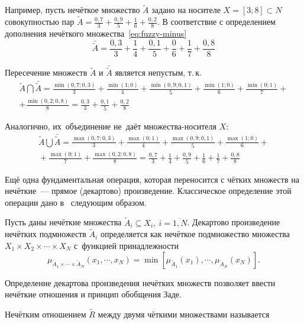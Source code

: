 Например, пусть нечёткое множество $\tilde A$ задано на носителе $\displaystyle X=\left[ 3;8 \right]\subset N$ совокупностью пар $\displaystyle \tilde{A}=\frac{0,7}{3}+\frac{0,9}{5}+\frac{1}{6}+\frac{0,2}{8}$. 
В соответствие с определением дополнения нечёткого множества~\eqref{eq:fuzzy-minus}
\begin{equation*}
  \bar{\tilde{A}}=\frac{0,3}{3}+\frac{1}{4}+\frac{0,1}{5}+\frac{0}{6}+\frac{1}{7}+\frac{0,8}{8}
\end{equation*}

Пересечение множеств $\tilde A$ и $\bar \tilde A$ является непустым, т.\,к.
\begin{gather*}
  \tilde{A}\bigcap \bar{\tilde A}=\frac{\min \left( 0,7;0,3 \right)}{3}+\frac{\min \left( 1;0 \right)}{4}+\frac{\min \left( 0,9;0,1 \right)}{5}+\frac{\min (1;0)}{6}+\frac{\min \left( 0;1 \right)}{7}+\\
  +\frac{\min \left( 0,2;0,8 \right)}{8}=\frac{0,3}{3}+\frac{0,1}{5}+\frac{0,2}{8} 
\end{gather*}

Аналогично, их~объединение не~даёт множества-носителя $X$:
\begin{gather*}
  \tilde{A}\bigcup \bar{\tilde{A}}=\frac{\max \left( 0,7;0,3 \right)}{3}+\frac{\max \left( 0;1 \right)}{4}+\frac{\max \left( 0,9;0,1 \right)}{5}+\frac{\max \left( 1;0 \right)}{6}+{}\\
  {}+\frac{\max \left( 0;1 \right)}{7}+\frac{\max \left( 0,2;0,8 \right)}{8}=\frac{0,7}{3}+\frac{1}{4}+\frac{0,9}{5}+\frac{1}{6}+\frac{1}{7}+\frac{0,8}{8} 
\end{gather*}

Ещё одна фундаментальная операция, которая переносится с чётких множеств на нечёткие~--- прямое (декартово) произведение. Классическое определение этой операции дано в~\cite{Zadeh_LingVar} следующим образом.
\begin{mydef}
  Пусть даны нечёткие множества $\tilde A_i \subseteq X_i,\ i=\overline{1, N}$. Декартово произведение нечётких подмножеств $\tilde A_i$ определяется как нечёткое подмножество множества $X_1 \times X_2 \times \cdots \times X_N$ с~функцией принадлежности
  \begin{equation}
    \label{eq:fuzzy-decartes}
    \mu_{\tilde A_1 \times \cdots \times \tilde A_N} \left( x_1, \cdots, x_N \right) = \mathop{ \min} \left[ \mu_{\tilde A_1}\left( x_1\right), \cdots, \mu_{\tilde A_N}\left(x_N \right) \right].
  \end{equation}
\end{mydef}
Определение декартова произведения нечётких множеств позволяет ввести нечёткие отношения и принцип обобщения Заде.
\begin{mydef}
  Нечётким отношением $\tilde R$ между двумя чёткими множествами называется 
\end{mydef}

